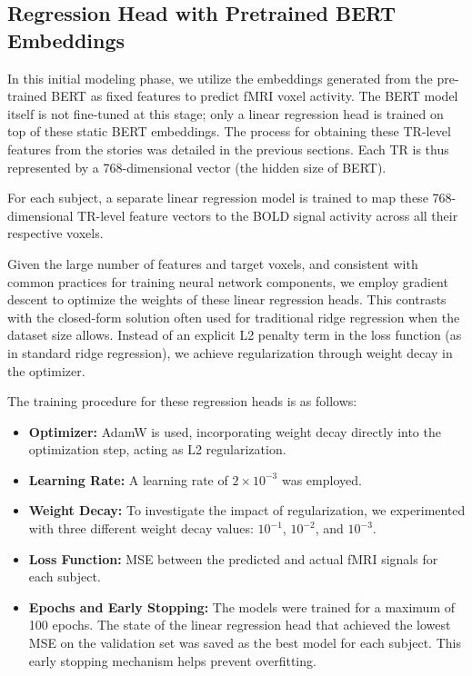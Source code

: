 \documentclass[10pt,letterpaper]{article}
\begin{document}
\subsection{Regression Head with Pretrained BERT Embeddings}

In this initial modeling phase, we utilize the embeddings generated from the pre-trained BERT as fixed features to predict fMRI voxel activity. The BERT model itself is not fine-tuned at this stage; only a linear regression head is trained on top of these static BERT embeddings. The process for obtaining these TR-level features from the stories was detailed in the previous sections. Each TR is thus represented by a 768-dimensional vector (the hidden size of BERT).

For each subject, a separate linear regression model is trained to map these 768-dimensional TR-level feature vectors to the BOLD signal activity across all their respective voxels.

Given the large number of features and target voxels, and consistent with common practices for training neural network components, we employ gradient descent to optimize the weights of these linear regression heads. This contrasts with the closed-form solution often used for traditional ridge regression when the dataset size allows. Instead of an explicit L2 penalty term in the loss function (as in standard ridge regression), we achieve regularization through weight decay in the optimizer.

The training procedure for these regression heads is as follows:
\begin{itemize}
    \item \textbf{Optimizer:} AdamW \cite{loshchilov2017decoupled} is used, incorporating weight decay directly into the optimization step, acting as L2 regularization.
    \item \textbf{Learning Rate:} A learning rate of $2 \times 10^{-3}$ was employed.
    \item \textbf{Weight Decay:} To investigate the impact of regularization, we experimented with three different weight decay values: $10^{-1}$, $10^{-2}$, and $10^{-3}$.
    \item \textbf{Loss Function:} MSE between the predicted and actual fMRI signals for each subject.
    \item \textbf{Epochs and Early Stopping:} The models were trained for a maximum of 100 epochs. The state of the linear regression head that achieved the lowest MSE on the validation set was saved as the best model for each subject. This early stopping mechanism helps prevent overfitting.
\end{itemize}
\end{document}
